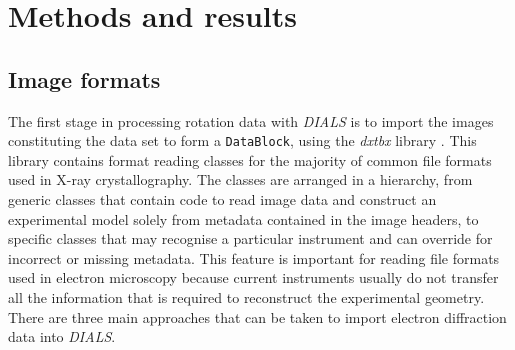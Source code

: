 \documentclass[preprint]{iucr}
\newcommand{\dxtbx}{\emph{dxtbx}\xspace}
\newcommand{\dials}{\emph{DIALS}\xspace}
\newcommand{\code}{\texttt}
\begin{document}
\section{Methods and results}
\subsection{Image formats}

The first stage in processing rotation data with \dials is to import the images
constituting the data set to form a \code{DataBlock}, using the \dxtbx library
\cite{Parkhurst2014}. This library contains format reading classes for the
majority of common file formats used in X-ray crystallography. The classes are
arranged in a hierarchy, from generic classes that contain code to read image
data and construct an experimental model solely from metadata contained in the
image headers, to specific classes that may recognise a particular instrument
and can override for incorrect or missing metadata. This feature is important
for reading file formats used in electron microscopy because current
instruments usually do not transfer all the information that is required to
reconstruct the experimental geometry. There are three main approaches that can
be taken to import electron diffraction data into \dials.
\end{document}
